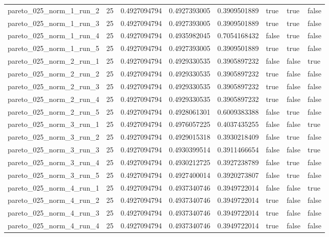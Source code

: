 \begin{tabular}{@{}llllllll@{}}
pareto\_025\_norm\_1\_run\_2 & 25 & 0.4927094794 & 0.4927393005 & 0.3909501889 & true & true & false \\
pareto\_025\_norm\_1\_run\_3 & 25 & 0.4927094794 & 0.4927393005 & 0.3909501889 & true & true & false \\
pareto\_025\_norm\_1\_run\_4 & 25 & 0.4927094794 & 0.4935982045 & 0.7054168432 & false & true & false \\
pareto\_025\_norm\_1\_run\_5 & 25 & 0.4927094794 & 0.4927393005 & 0.3909501889 & true & true & false \\
pareto\_025\_norm\_2\_run\_1 & 25 & 0.4927094794 & 0.4929330535 & 0.3905897232 & false & false & true \\
pareto\_025\_norm\_2\_run\_2 & 25 & 0.4927094794 & 0.4929330535 & 0.3905897232 & true & false & false \\
pareto\_025\_norm\_2\_run\_3 & 25 & 0.4927094794 & 0.4929330535 & 0.3905897232 & true & false & false \\
pareto\_025\_norm\_2\_run\_4 & 25 & 0.4927094794 & 0.4929330535 & 0.3905897232 & true & false & false \\
pareto\_025\_norm\_2\_run\_5 & 25 & 0.4927094794 & 0.4928061301 & 0.6009383388 & false & true & false \\
pareto\_025\_norm\_3\_run\_1 & 25 & 0.4927094794 & 0.4976057225 & 0.4037435255 & false & false & true \\
pareto\_025\_norm\_3\_run\_2 & 25 & 0.4927094794 & 0.4929015318 & 0.3930218409 & false & true & false \\
pareto\_025\_norm\_3\_run\_3 & 25 & 0.4927094794 & 0.4930399514 & 0.3911466654 & false & false & true \\
pareto\_025\_norm\_3\_run\_4 & 25 & 0.4927094794 & 0.4930212725 & 0.3927238789 & false & true & false \\
pareto\_025\_norm\_3\_run\_5 & 25 & 0.4927094794 & 0.4927400014 & 0.3920273807 & false & true & false \\
pareto\_025\_norm\_4\_run\_1 & 25 & 0.4927094794 & 0.4937340746 & 0.3949722014 & false & false & true \\
pareto\_025\_norm\_4\_run\_2 & 25 & 0.4927094794 & 0.4937340746 & 0.3949722014 & true & false & false \\
pareto\_025\_norm\_4\_run\_3 & 25 & 0.4927094794 & 0.4937340746 & 0.3949722014 & true & false & false \\
pareto\_025\_norm\_4\_run\_4 & 25 & 0.4927094794 & 0.4937340746 & 0.3949722014 & true & false & false \\

\end{tabular}
